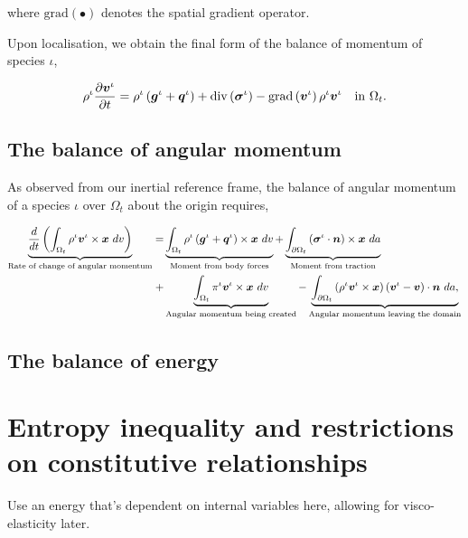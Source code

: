where $\mathrm{grad} (\bullet)$ denotes the spatial gradient
operator.

Upon localisation, we obtain the final form of the balance of momentum
of species $\iota$,

\begin{equation}
\rho^{\iota} \frac{\partial \mbox{\boldmath$ v$}^{\iota}} {\partial t} = \rho^{\iota}
\left(\mbox{\boldmath$ g$}^{\iota}+\mbox{\boldmath$ q$}^{\iota}\right)  
+ \mathrm{div}\left(\mbox{\boldmath$\sigma$}^{\iota}\right)
- \mathrm{grad}\left(\mbox{\boldmath$ v$}^{\iota}\right) \rho^{\iota}\mbox{\boldmath$ v$}^{\iota}
\quad \mathrm{in}\ \Omega_{t}.
\label{localbalanceofmomentum}
\end{equation}


\subsection{The balance of angular momentum}
\label{eu-balance-of-angular-momentum}

As observed from our inertial reference frame, the balance of
angular momentum of a species $\iota$ over $\Omega_{t}$ about the
origin requires,

\begin{equation}
\begin{split}
\underbrace{\frac{d}{dt}\left(\int_{\Omega_{t}} \rho^{\iota}
  \mbox{\boldmath$ v$}^{\iota} \times \mbox{\boldmath$ x$}\ dv\right)}_{\text{Rate of change of angular  momentum}}  = 
& \underbrace{\int_{\Omega_{t}} \rho^{\iota} \left(\mbox{\boldmath$ g$}^{\iota} +
  \mbox{\boldmath$ q$}^{\iota}\right) \times \mbox{\boldmath$ x$}\ dv}_{\text{Moment from body forces}} 
+ \underbrace{\int_{\partial \Omega_{t}}
  \left(\mbox{\boldmath$\sigma$}^{\iota}\cdot\mbox{\boldmath$ n$}\right) \times \mbox{\boldmath$ x$}\ da}_{\text{Moment from traction}}\\ 
+ & \underbrace{\int_{\Omega_{t}} \pi^{\iota}\mbox{\boldmath$ v$}^{\iota} \times
  \mbox{\boldmath$ x$}\ dv}_{\text{Angular momentum being created}} 
- \underbrace{\int_{\partial \Omega_{t}} \left(\rho^{\iota}
  \mbox{\boldmath$ v$}^{\iota}  \times \mbox{\boldmath$ x$}\right) \left(\mbox{\boldmath$ v$}^{\iota} -
\mbox{\boldmath$ v$}\right) \cdot \mbox{\boldmath$ n$}\ da,}_{\text{Angular momentum leaving the domain}} 
\end{split}
\label{globalbalanceofangularmomentum}
\end{equation}

\subsection{The balance of energy}
\label{eu-balance-of-energy}

\section{Entropy inequality and restrictions on constitutive relationships}
Use an energy that's dependent on internal variables here, allowing for visco-elasticity later.
